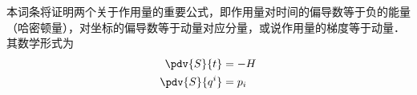 本词条将证明两个关于作用量的重要公式，即作用量对时间的偏导数等于负的能量（哈密顿量），对坐标的偏导数等于动量对应分量，或说作用量的梯度等于动量．其数学形式为
\begin{equation}
\begin{aligned}
\pdv{S}{t}&=-H\\
\pdv{S}{q^i}&=p_i
\end{aligned}
\end{equation}

